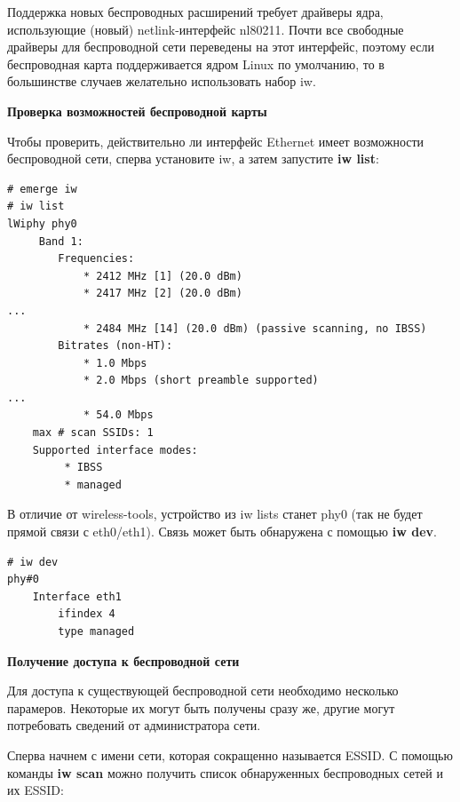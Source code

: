 \documentclass[10pt]{book}
\begin{document}
Поддержка новых беспроводных расширений требует драйверы ядра, использующие (новый) netlink-интерфейс nl80211. Почти все свободные драйверы для беспроводной сети переведены на этот интерфейс, поэтому если беспроводная карта поддерживается ядром Linux по умолчанию, то в большинстве случаев желательно использовать набор iw.

\textbf{Проверка возможностей беспроводной карты}

Чтобы проверить, действительно ли интерфейс Ethernet имеет возможности беспроводной сети, сперва установите iw, а затем запустите \textbf{iw list}:

\begin{tcolorbox}
\begin{lstlisting}
# emerge iw
# iw list
lWiphy phy0
	 Band 1:
		Frequencies:
			* 2412 MHz [1] (20.0 dBm)
			* 2417 MHz [2] (20.0 dBm)
...
			* 2484 MHz [14] (20.0 dBm) (passive scanning, no IBSS)
		Bitrates (non-HT):
			* 1.0 Mbps
			* 2.0 Mbps (short preamble supported)
...
			* 54.0 Mbps
	max # scan SSIDs: 1
	Supported interface modes:
		 * IBSS
		 * managed
\end{lstlisting}
\end{tcolorbox}

В отличие от wireless-tools, устройство из iw lists станет phy0 (так не будет прямой связи с eth0/eth1). Связь может быть обнаружена с помощью \textbf{iw dev}.

\begin{tcolorbox}
\begin{lstlisting}
# iw dev
phy#0
	Interface eth1
		ifindex 4
		type managed
\end{lstlisting}
\end{tcolorbox}

\textbf{Получение доступа к беспроводной сети}

Для доступа к существующей беспроводной сети необходимо несколько парамеров. Некоторые их могут быть получены сразу же, другие могут потребовать сведений от администратора сети.

Сперва начнем с имени сети, которая сокращенно называется ESSID. С помощью команды  \textbf{iw scan} можно получить список обнаруженных беспроводных сетей и их ESSID:
\end{document}
